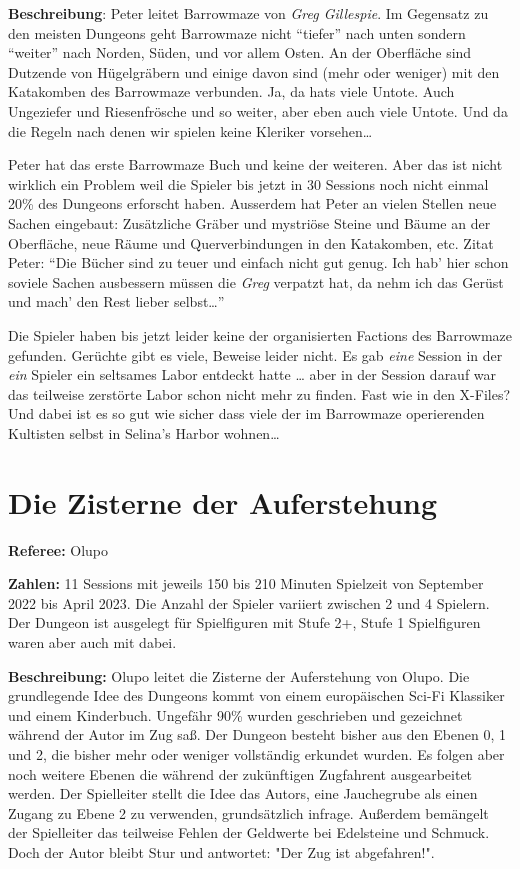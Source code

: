 \documentclass[11pt]{wbzine}
\begin{document}
\begin{multicols}{2}
\textbf{Beschreibung}: Peter leitet Barrowmaze von \textit{Greg Gillespie}.
Im Gegensatz zu den meisten Dungeons geht Barrowmaze nicht ``tiefer'' nach
unten sondern ``weiter'' nach Norden, Süden, und vor allem Osten. An der
Oberfläche sind Dutzende von Hügelgräbern und einige davon sind (mehr oder
weniger) mit den Katakomben des Barrowmaze verbunden. Ja, da hats viele
Untote. Auch Ungeziefer und Riesenfrösche und so weiter, aber eben auch
viele Untote. Und da die Regeln nach denen wir spielen keine Kleriker
vorsehen\dots{}

Peter hat das erste Barrowmaze Buch und keine der weiteren. Aber das ist
nicht wirklich ein Problem weil die Spieler bis jetzt in 30 Sessions noch
nicht einmal 20\% des Dungeons erforscht haben. Ausserdem hat Peter an
vielen Stellen neue Sachen eingebaut: Zusätzliche Gräber und mystriöse
Steine und Bäume an der Oberfläche, neue Räume und Querverbindungen in
den Katakomben, etc. Zitat Peter: ``Die Bücher sind zu teuer und einfach
nicht gut genug. Ich hab' hier schon soviele Sachen ausbessern müssen die
\textit{Greg} verpatzt hat, da nehm ich das Gerüst und mach' den Rest
lieber selbst\dots{}''

Die Spieler haben bis jetzt leider keine der organisierten Factions des
Barrowmaze gefunden. Gerüchte gibt es viele, Beweise leider nicht. Es gab
\emph{eine} Session in der \emph{ein} Spieler ein seltsames Labor entdeckt
hatte \dots{} aber in der Session darauf war das teilweise zerstörte Labor
schon nicht mehr zu finden. Fast wie in den X-Files? Und dabei ist es so
gut wie sicher dass viele der im Barrowmaze operierenden Kultisten selbst
in Selina's Harbor wohnen\dots{}

\section{Die Zisterne der Auferstehung}

\textbf{Referee:} Olupo

\textbf{Zahlen:} 11 Sessions mit jeweils 150 bis 210 Minuten Spielzeit von
September 2022 bis April 2023. Die Anzahl der Spieler variiert zwischen
2 und 4 Spielern. Der Dungeon ist ausgelegt für Spielfiguren mit Stufe
2+, Stufe 1 Spielfiguren waren aber auch mit dabei.

\textbf{Beschreibung:} Olupo leitet die Zisterne der Auferstehung von
Olupo. Die grundlegende Idee des Dungeons kommt von einem europäischen
Sci-Fi Klassiker und einem Kinderbuch. Ungefähr 90\% wurden geschrieben
und gezeichnet während der Autor im Zug saß. Der Dungeon besteht bisher
aus den Ebenen 0, 1 und 2, die bisher mehr oder weniger vollständig
erkundet wurden. Es folgen aber noch weitere Ebenen die während der
zukünftigen Zugfahrent ausgearbeitet werden. Der Spielleiter stellt
die Idee das Autors, eine Jauchegrube als einen Zugang zu Ebene 2 zu
verwenden, grundsätzlich infrage. Außerdem bemängelt der Spielleiter
das teilweise Fehlen der Geldwerte bei Edelsteine und Schmuck. Doch der
Autor bleibt Stur und antwortet: "Der Zug ist abgefahren!".


\end{multicols}
\end{document}
